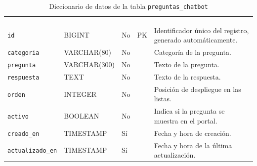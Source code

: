 \footnotesize
\renewcommand{\arraystretch}{1.15}
\setlength{\tabcolsep}{4pt}
\begin{longtable}{|L{3.9cm}|L{2.4cm}|L{0.9cm}|L{1.2cm}|L{6.6cm}|}
	\hiderowcolors\caption{Diccionario de datos de la tabla \texttt{preguntas\_chatbot}}
	\label{tab:dic_preguntas_chatbot} \\ \showrowcolors
	\hline
	 &  &  &  &  \\
	\hline
	\endfirsthead
	\hline
	 &  &  &  &  \\
	\hline
	\endhead
		\texttt{id} & BIGINT & No & PK & Identificador único del registro, generado automáticamente. \\ \hline
		\texttt{categoria} & VARCHAR(80) & No &  & Categoría de la pregunta. \\ \hline
		\texttt{pregunta} & VARCHAR(300) & No &  & Texto de la pregunta. \\ \hline
		\texttt{respuesta} & TEXT & No &  & Texto de la respuesta. \\ \hline
		\texttt{orden} & INTEGER & No &  & Posición de despliegue en las listas. \\ \hline
		\texttt{activo} & BOOLEAN & No &  & Indica si la pregunta se muestra en el portal. \\ \hline
		\texttt{creado\_\allowbreak{}en} & TIMESTAMP & Sí &  & Fecha y hora de creación. \\ \hline
		\texttt{actualizado\_\allowbreak{}en} & TIMESTAMP & Sí &  & Fecha y hora de la última actualización. \\ \hline
\end{longtable}
\normalsize
\setlength{\tabcolsep}{6pt}
\renewcommand{\arraystretch}{1}
